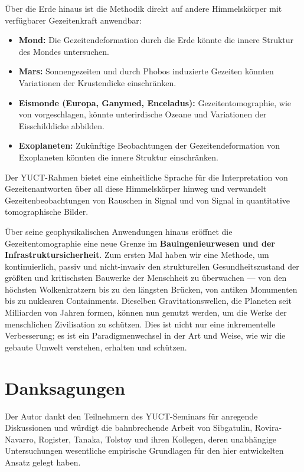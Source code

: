 \documentclass[12pt,a4paper]{article}
\theoremstyle{remark}
\begin{document}
	Über die Erde hinaus ist die Methodik direkt auf andere Himmelskörper mit verfügbarer Gezeitenkraft anwendbar:
	
	\begin{itemize}
		\item \textbf{Mond:} Die Gezeitendeformation durch die Erde könnte die innere Struktur des Mondes untersuchen.
		\item \textbf{Mars:} Sonnengezeiten und durch Phobos induzierte Gezeiten könnten Variationen der Krustendicke einschränken.
		\item \textbf{Eismonde (Europa, Ganymed, Enceladus):} Gezeitentomographie, wie von \cite{RoviraNavarro2025} vorgeschlagen, könnte unterirdische Ozeane und Variationen der Eisschilddicke abbilden.
		\item \textbf{Exoplaneten:} Zukünftige Beobachtungen der Gezeitendeformation von Exoplaneten könnten die innere Struktur einschränken.
	\end{itemize}
	
	Der YUCT-Rahmen bietet eine einheitliche Sprache für die Interpretation von Gezeitenantworten über all diese Himmelskörper hinweg und verwandelt Gezeitenbeobachtungen von Rauschen in Signal und von Signal in quantitative tomographische Bilder.
	
	Über seine geophysikalischen Anwendungen hinaus eröffnet die Gezeitentomographie eine neue Grenze im \textbf{Bauingenieurwesen und der Infrastruktursicherheit}. Zum ersten Mal haben wir eine Methode, um kontinuierlich, passiv und nicht-invasiv den strukturellen Gesundheitszustand der größten und kritischsten Bauwerke der Menschheit zu überwachen — von den höchsten Wolkenkratzern bis zu den längsten Brücken, von antiken Monumenten bis zu nuklearen Containments. Dieselben Gravitationswellen, die Planeten seit Milliarden von Jahren formen, können nun genutzt werden, um die Werke der menschlichen Zivilisation zu schützen. Dies ist nicht nur eine inkrementelle Verbesserung; es ist ein Paradigmenwechsel in der Art und Weise, wie wir die gebaute Umwelt verstehen, erhalten und schützen.
	
	\section*{Danksagungen}
	
	Der Autor dankt den Teilnehmern des YUCT-Seminars für anregende Diskussionen und würdigt die bahnbrechende Arbeit von Sibgatulin, Rovira-Navarro, Rogister, Tanaka, Tolstoy und ihren Kollegen, deren unabhängige Untersuchungen wesentliche empirische Grundlagen für den hier entwickelten Ansatz gelegt haben.
	
\end{document}
